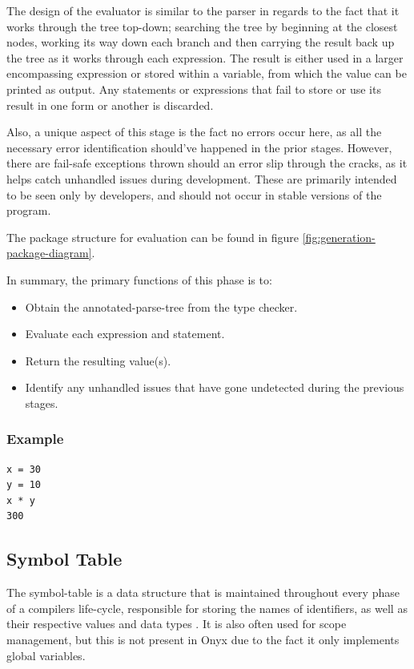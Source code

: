 \documentclass[
]{report}
\begin{document}
The design of the evaluator is similar to the parser in regards to the
fact that it works through the tree top-down; searching the tree by
beginning at the closest nodes, working its way down each branch and
then carrying the result back up the tree as it works through each
\gls{expression}. The result is either used in a larger encompassing
\gls{expression} or stored within a variable, from which the value can be
printed as output. Any \glspl{statement} or \glspl{expression} that fail to store or
use its result in one form or another is discarded.

Also, a unique aspect of this stage is the fact no errors occur here, as
all the necessary error identification should've happened in the prior
stages. However, there are fail-safe exceptions thrown should an error
slip through the cracks, as it helps catch unhandled issues during
development. These are primarily intended to be seen only by developers,
and should not occur in stable versions of the program.

The package structure for evaluation can be found in figure \ref{fig:generation-package-diagram}.

In summary, the primary functions of this phase is to: 
\begin{itemize}
	\item Obtain the \gls{annotated-parse-tree} from the type checker.
	\item Evaluate each \gls{expression} and \gls{statement}.
	\item Return the resulting value(s).
	\item Identify any unhandled issues that have gone undetected during the previous stages.
\end{itemize}

\subsubsection{Example}
\begin{verbatim}
x = 30
y = 10
x * y
300
\end{verbatim}

\subsection{Symbol Table}
The \gls{symbol-table} is a data structure that is maintained throughout every
phase of a compilers life-cycle, responsible for storing the names of
\glspl{identifier}, as well as their respective values and data types \cite{tutorials-guide}.
It is also often used for scope management, but this is not present in
Onyx due to the fact it only implements global variables.
\end{document}
